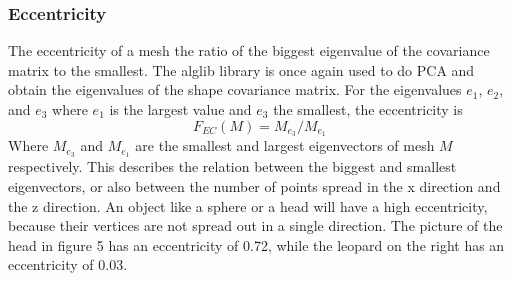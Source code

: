 \documentclass{bigdata}
\begin{document}
\subsubsection{Eccentricity}
The eccentricity of a mesh the ratio of the biggest eigenvalue of the covariance matrix to the smallest. The alglib library is once again used to do PCA and obtain the eigenvalues of the shape covariance matrix. For the eigenvalues $e_1$, $e_2$, and $e_3$ where $e_1$ is the largest value and $e_3$ the smallest, the eccentricity is
\begin{equation}
F_{EC}(M) = M_{e_3} / M_{e_1}
\end{equation}
Where $M_{e_3}$ and $M_{e_1}$ are the smallest and largest eigenvectors of mesh $M$ respectively. This describes the relation between the biggest and smallest eigenvectors, or also between the number of points spread in the x direction and the z direction. An object like a sphere or a head will have a high eccentricity, because their vertices are not spread out in a single direction. The picture of the head in figure 5 has an eccentricity of 0.72, while the leopard on the right has an eccentricity of 0.03.
\end{document}

